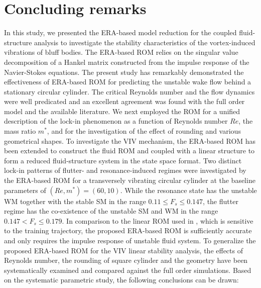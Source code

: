 \documentclass{jfm}
\begin{document}
\section{Concluding remarks}
In this study, we presented the ERA-based model reduction 
for the coupled fluid-structure analysis to investigate the stability characteristics 
of the vortex-induced vibrations of bluff bodies. The ERA-based ROM relies on
the singular value decomposition of a Hankel matrix constructed from the impulse response of the Navier-Stokes equations.
The present study has remarkably demonstrated the effectiveness of 
ERA-based ROM for predicting the unstable wake flow behind a stationary circular cylinder.
The critical Reynolds number and the flow dynamics were well predicated and an 
excellent agreement was found with the full order model and the available literature.
We next employed the ROM for a unified description of the lock-in phenomenon 
as a function of Reynolds number $Re$, the mass ratio $m^*$, 
and for the investigation of the effect of rounding  and various geometrical shapes.
%
To investigate the VIV mechanism, the ERA-based ROM has been extended to construct 
the fluid ROM and coupled with a linear structure to form a reduced fluid-structure system 
in the state space format. 
%
Two distinct lock-in patterns of flutter- and resonance-induced regimes 
were investigated by the ERA-based ROM 
for a transversely vibrating circular cylinder at the baseline parameters of 
$(Re,m^*)=(60,10)$.
While the resonance state has the unstable WM together with the stable SM  
in the range $0.11 \le F_{s} \le 0.147$, the flutter regime 
has the co-existence of the unstable  SM and WM in the range $0.147 < F_{s} \le 0.179$.
In comparison to the linear ROM used in \cite{Zhang2015},
which is sensitive to the training trajectory, 
the proposed ERA-based ROM is sufficiently accurate and only requires the impulse response of unstable fluid system. 
To generalize the proposed ERA-based ROM for the VIV linear stability analysis, 
the effects of Reynolds number, the rounding of square cylinder 
and the geometry have been systematically examined and compared against the full order simulations.
Based on the systematic parametric study, the following conclusions can be drawn:
\end{document}
